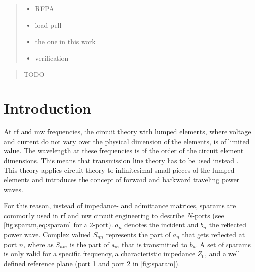 \documentclass[12pt,a4paper,parskip=full,abstract=true,BCOR=12mm,twoside,open=right]{scrreprt}
\begin{document}
\begin{otherlanguage}{ngerman}
\begin{abstract}
    \begin{itemize}
        \item RFPA
        \item load-pull
        \item the one in this work
        \item verification
    \end{itemize}
\end{abstract}
\end{otherlanguage}

\renewcommand{\abstractname}{Acknowledgements}
\begin{abstract}
    TODO
\end{abstract}

\tableofcontents

\chapter{Introduction}
\label{chap:introduction}

At \gls{rf} and \gls{mw} frequencies, the circuit theory with lumped elements, where
voltage and current do not vary over the physical dimension of the elements, is of limited
value. The wavelength at these frequencies is of the order of the circuit
element dimensions. This means that transmission line theory has to be used instead \cite{pozar_mw_engineering_2011}.
This theory applies circuit theory to infinitesimal small pieces of the lumped elements
and introduces the concept of forward and backward traveling power waves.

For this reason, instead of impedance- and admittance matrices, \glspl{sparam}
are commonly used in \gls{rf} and \gls{mw} circuit engineering to describe
$N$-ports (see \cref{fig:sparam,eq:sparam} for a 2-port). $a_n$ denotes the incident and
$b_n$ the reflected power wave. Complex valued $S_{nn}$ represents the
part of $a_n$ that gets reflected at port $n$, where as $S_{nm}$ is the part of $a_m$ that
is transmitted to $b_n$. A set of \glspl{sparam} is only valid for a specific frequency, a
characteristic impedance $Z_0$, and a well defined reference plane (port 1 and port 2 in \cref{fig:sparam}).
\end{document}

